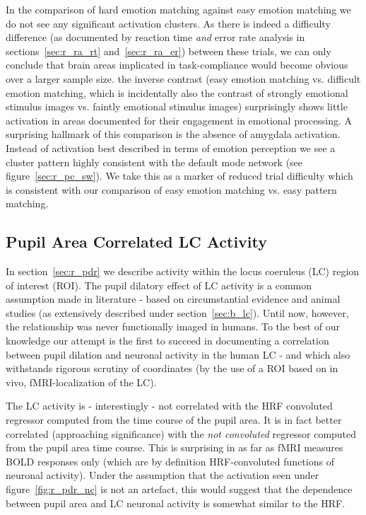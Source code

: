 	    In the comparison of hard emotion matching against easy emotion matching we do not see any significant activation clusters.
	    As there is indeed a difficulty difference (as documented by reaction time \textit{and} error rate analysis in sections~\ref{sec:r_ra_rt} and~\ref{sec:r_ra_er}) between these trials, we can only conclude that brain areas implicated in task-compliance would become obvious over a larger sample size.
	    the inverse contrast (easy emotion matching vs. difficult emotion matching, which is incidentally also the contrast of strongly emotional stimulus images vs. faintly emotional stimulus images) surprisingly shows little activation in areas documented for their engagement in emotional processing.
	    A surprising hallmark of this comparison is the absence of amygdala activation.
	    Instead of activation best described in terms of emotion perception we see a cluster pattern highly consistent with the default mode network (see figure~\ref{sec:r_pc_sw}).
	    We take this as a marker of reduced trial difficulty which is consistent with our comparison of easy emotion matching vs. easy pattern matching. 
	\subsection{Pupil Area Correlated LC Activity}
	    In section~\ref{sec:r_pdr} we describe activity within the locus coeruleus (LC) region of interest (ROI).
	    The pupil dilatory effect of LC activity is a common assumption made in literature - based on circumstantial evidence and animal studies (as extensively described under section~\ref{sec:b_lc}).
	    Until now, however, the relationship was never functionally imaged in humans. 
	    To the best of our knowledge our attempt is the first to succeed in documenting a correlation between pupil dilation and neuronal activity in the human LC - and which also withstands rigorous scrutiny of coordinates (by the use of a ROI based on in vivo, fMRI-localization of the LC).
	     
	    The LC activity is - interestingly - not correlated with the HRF convoluted regressor computed from the time course of the pupil area.
	    It is in fact better correlated (approaching significance) with the \textit{not convoluted} regressor computed from the pupil area time course.
	    This is surprising in as far as fMRI measures BOLD responses only (which are by definition HRF-convoluted functions of neuronal activity).
	    Under the assumption that the activation seen under figure~\ref{fig:r_pdr_nc} is not an artefact, this would suggest that the dependence between pupil area and LC neuronal activity is somewhat similar to the HRF.
	    
